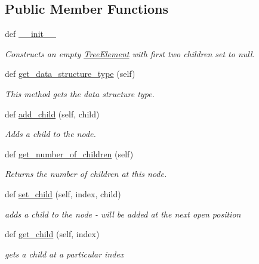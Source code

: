 \subsection*{Public Member Functions}
\begin{DoxyCompactItemize}
\item 
def \hyperlink{class_tree_element_1_1_tree_element_aa723139eac741f5e4318c0e546511272}{\+\_\+\+\_\+init\+\_\+\+\_\+}
\begin{DoxyCompactList}\small\item\em Constructs an empty \hyperlink{class_tree_element_1_1_tree_element}{Tree\+Element} with first two children set to null. \end{DoxyCompactList}\item 
def \hyperlink{class_tree_element_1_1_tree_element_a524729eed4d8a0ba3dc9e857777f3fd3}{get\+\_\+data\+\_\+structure\+\_\+type} (self)
\begin{DoxyCompactList}\small\item\em This method gets the data structure type. \end{DoxyCompactList}\item 
def \hyperlink{class_tree_element_1_1_tree_element_a472f1d0d906f4a8a8c48a54d83d42fd5}{add\+\_\+child} (self, child)
\begin{DoxyCompactList}\small\item\em Adds a child to the node. \end{DoxyCompactList}\item 
def \hyperlink{class_tree_element_1_1_tree_element_a8e5eb2215d0eaddf851cf2e3cbd2483b}{get\+\_\+number\+\_\+of\+\_\+children} (self)
\begin{DoxyCompactList}\small\item\em Returns the number of children at this node. \end{DoxyCompactList}\item 
def \hyperlink{class_tree_element_1_1_tree_element_a9a4b8a9c36075af52feea0b227ddac17}{set\+\_\+child} (self, index, child)
\begin{DoxyCompactList}\small\item\em adds a child to the node -\/ will be added at the next open position \end{DoxyCompactList}\item 
def \hyperlink{class_tree_element_1_1_tree_element_a242942c3685752b9ad29bd73a9200b59}{get\+\_\+child} (self, index)
\begin{DoxyCompactList}\small\item\em gets a child at a particular index \end{DoxyCompactList}\item 

\end{DoxyCompactItemize}
